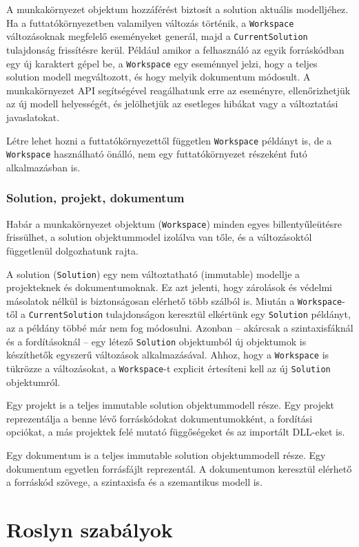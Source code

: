 \documentclass[12pt, a4paper]{report}
\newcommand{\f}[1]{\texttt{#1}}
\begin{document}
A munkakörnyezet objektum hozzáférést biztosít a solution aktuális modelljéhez. Ha a futtatókörnyezetben valamilyen változás történik, a \f{Workspace} változásoknak megfelelő eseményeket generál, majd a \f{CurrentSolution} tulajdonság frissítésre kerül. Például amikor a felhasználó az egyik forráskódban egy új karaktert gépel be, a \f{Workspace} egy eseménnyel jelzi, hogy a teljes solution modell megváltozott, és hogy melyik dokumentum módosult. A munkakörnyezet API segítségével reagálhatunk erre az eseményre, ellenőrizhetjük az új modell helyességét, és jelölhetjük az esetleges hibákat vagy a változtatási javaslatokat.

Létre lehet hozni a futtatókörnyezettől független \f{Workspace} példányt is, de a \f{Workspace} használható önálló, nem egy futtatókörnyezet részeként futó alkalmazásban is.

\subsubsection{Solution, projekt, dokumentum}

Habár a munkakörnyezet objektum (\f{Workspace}) minden egyes billentyűleütésre frissülhet, a solution objektummodel izolálva van tőle, és a változásoktól függetlenül dolgozhatunk rajta.

A solution (\f{Solution}) egy nem változtatható (immutable) modellje a projekteknek és dokumentumoknak. Ez azt jelenti, hogy zárolások és védelmi másolatok nélkül is biztonságosan elérhető több szálból is. Miután a \f{Workspace}-től a \f{CurrentSolution} tulajdonságon keresztül elkértünk egy \f{Solution} példányt, az a példány többé már nem fog módosulni. Azonban -- akárcsak a szintaxisfáknál és a fordításoknál -- egy létező \f{Solution} objektumból új objektumok is készíthetők egyszerű változások alkalmazásával. Ahhoz, hogy a \f{Workspace} is tükrözze a változásokat, a \f{Workspace}-t explicit értesíteni kell az új \f{Solution} objektumról.

Egy projekt is a teljes immutable solution objektummodell része. Egy projekt reprezentálja a benne lévő forráskódokat dokumentumokként, a fordítási opciókat, a más projektek felé mutató függőségeket és az importált DLL-eket is.

Egy dokumentum is a teljes immutable solution objektummodell része. Egy dokumentum egyetlen forrásfájlt reprezentál. A dokumentumon keresztül elérhető a forráskód szövege, a szintaxisfa és a szemantikus modell is.

\section{Roslyn szabályok}
\end{document}
